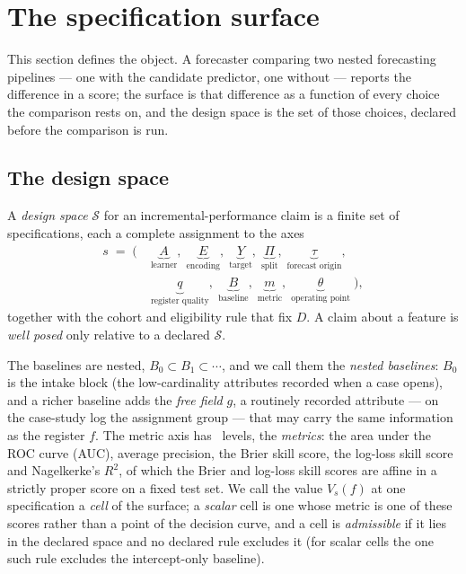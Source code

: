 
\section{The specification surface}
\label{sec:surface}

This section defines the object. A forecaster comparing two nested
forecasting pipelines --- one with the candidate predictor, one without ---
reports the difference in a score; the surface is that difference as a
function of every choice the comparison rests on, and the design space is
the set of those choices, declared before the comparison is run.

\subsection{The design space}

\begin{definition}
\label{def:space}
A \emph{design space} $\mathcal{S}$ for an incremental-performance claim is a finite set
of specifications, each a complete assignment to the axes
\[
\begin{aligned}
s \;=\; \bigl(\;
&\underbrace{A}_{\text{learner}},\;
\underbrace{E}_{\text{encoding}},\;
\underbrace{Y}_{\text{target}},\;
\underbrace{\Pi}_{\text{split}},\;
\underbrace{\tau}_{\text{forecast origin}},\; \\[2pt]
&\underbrace{q}_{\text{register quality}},\;
\underbrace{B}_{\text{baseline}},\;
\underbrace{m}_{\text{metric}},\;
\underbrace{\theta}_{\text{operating point}}\;\bigr),
\end{aligned}
\]
together with the cohort and eligibility rule that fix $D$. A claim about a
feature is \emph{well posed} only relative to a declared $\mathcal{S}$.
\end{definition}

\noindent The baselines are nested, $B_0 \subset B_1 \subset \cdots$, and we
call them the \emph{nested baselines}: $B_0$ is the intake block (the
low-cardinality attributes recorded when a case opens), and a richer baseline
adds the \emph{free field} $g$, a routinely recorded attribute --- on the
case-study log the assignment group --- that may carry the same information
as the register $f$. The metric axis has \nInstruments\ levels, the
\emph{metrics}: the area under the ROC curve (AUC), average precision, the
Brier skill score, the log-loss skill score and Nagelkerke's $R^2$, of which
the Brier and log-loss skill scores are affine in a strictly proper score on
a fixed test set. We call the value
$V_s(f)$ at one specification a \emph{cell} of the surface; a \emph{scalar}
cell is one whose metric is one of these scores rather than a point of the
decision curve, and a cell is \emph{admissible} if it lies in the declared
space and no declared rule excludes it (for scalar cells the one such rule
excludes the intercept-only baseline).

